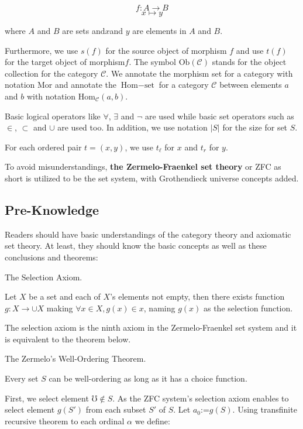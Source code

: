 \documentclass{article}
\begin{document}
\[f: A\to B\]
\[x\mapsto y\]

where \(A\) and \(B\) are sets and\(x\)and \(y\) are elements in \(A\) and \(B\).

 Furthermore, we use \(s(f)\) for the source object of morphism \(f\)\textit{  }and use \(t(f)\) for the target object of morphism\(f\). The symbol \(\text{Ob}(\mathcal{C})\) stands for the object collection for the category \(\mathcal{C}\). We annotate the morphism set for a category with notation \(\text{Mor}\) and annotate the \(\text{Hom}-\text{set}\) for a category \(\mathcal{C}\) between elements \(a\) and \(b\) with notation \(\text{Hom}_{\mathcal{C}}(a,b)\).

Basic logical operators like \(\forall\), \(\exists\) and \(\neg\) are used while basic set operators such as \(\in\), \(\subset\) and \(\cup\) are used too. In addition, we use notation \(|S|\) for the size for set \(S\).

For each ordered pair \(t=(x,y)\), we use \(t_{\ell }\) for \(x\) and \(t_{\mathit{r}}\) for \(y\).

To avoid misunderstandings, \textbf{the Zermelo-Fraenkel set theory} or ZFC as short is utilized to be the set system, with Grothendieck universe concepts added. \cite{1}

\subsection*{Pre-Knowledge}

Readers should have basic understandings of the category theory \cite{1} and axiomatic set theory. At least, they should know the basic concepts as well as these conclusions and theorems:

 The Selection Axiom.

Let \(X\) be a set and each of \(X\){'}s elements not empty, then there exists function \(g:X\to \cup X\) making \(\forall x\in X,g(x)\in x\), naming \(g(x)\) as the selection function.

The selection axiom is the ninth axiom in the Zermelo-Fraenkel set system and it is equivalent to the theorem below.

The Zermelo{'}s Well-Ordering Theorem.\cite{1}

Every set \(S\) can be well-ordering as long as it has a choice function.

 First, we select element \(\mho \notin S\). As the ZFC system{'}s selection axiom enables to select element \(g(S')\) from each subset \(S'\) of \(S\). Let \(a_0\text{:=}g(S)\). Using transfinite recursive theorem to each ordinal \(\alpha\) we define:
\end{document}
